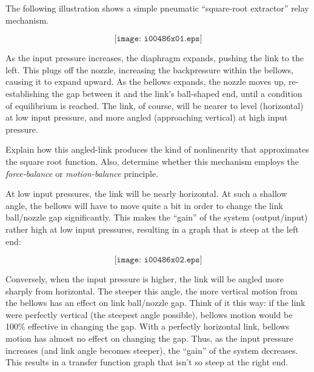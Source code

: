 

The following illustration shows a simple pneumatic ``square-root extractor'' relay mechanism.

$$\texttt{[image: i00486x01.eps]}$$

As the input pressure increases, the diaphragm expands, pushing the link to the left.  This plugs off the nozzle, increasing the backpressure within the bellows, causing it to expand upward.  As the bellows expands, the nozzle moves up, re-establishing the gap between it and the link's ball-shaped end, until a condition of equilibrium is reached.  The link, of course, will be nearer to level (horizontal) at low input pressure, and more angled (approaching vertical) at high input pressure.

Explain how this angled-link produces the kind of nonlinearity that approximates the square root function.  Also, determine whether this mechanism employs the {\it force-balance} or {\it motion-balance} principle.







At low input pressures, the link will be nearly horizontal.  At such a shallow angle, the bellows will have to move quite a bit in order to change the link ball/nozzle gap significantly.  This makes the ``gain'' of the system (output/input) rather high at low input pressures, resulting in a graph that is steep at the left end:

$$\texttt{[image: i00486x02.eps]}$$

Conversely, when the input pressure is higher, the link will be angled more sharply from horizontal.  The steeper this angle, the more vertical motion from the bellows has an effect on link ball/nozzle gap.  Think of it this way: if the link were perfectly vertical (the steepest angle possible), bellows motion would be 100\% effective in changing the gap.  With a perfectly horizontal link, bellows motion has almost no effect on changing the gap.  Thus, as the input pressure increases (and link angle becomes steeper), the ``gain'' of the system decreases.  This results in a transfer function graph that isn't so steep at the right end.

